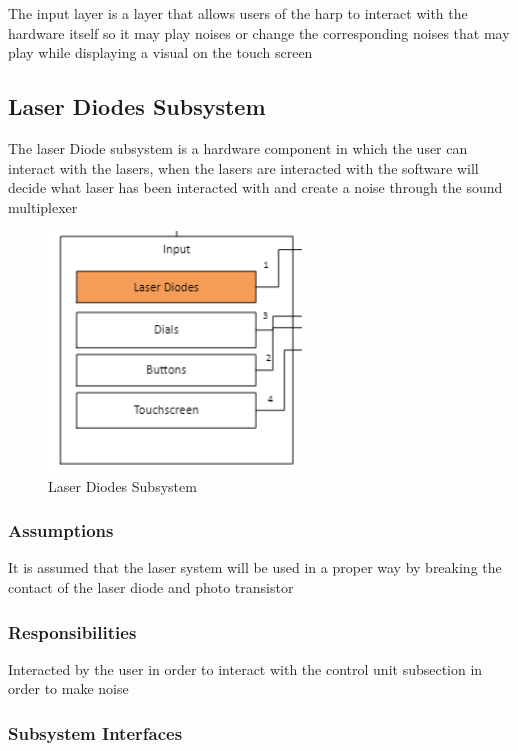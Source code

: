 The input layer is a layer that allows users of the harp to interact with the hardware itself so it may play noises or change the corresponding noises that may play while displaying a visual on the touch screen

\subsection{Laser Diodes Subsystem}
The laser Diode subsystem is a hardware component in which the user can interact with the lasers, when the lasers are interacted with the software will decide what laser has been interacted with and create a noise through the sound multiplexer


\begin{figure}[h!]
	\centering
 	\includegraphics[width=0.60\textwidth]{images/Laserdiodes}
 \caption{Laser Diodes Subsystem}
\end{figure}

\subsubsection{Assumptions}
It is assumed that the laser system will be used in a proper way by breaking the contact of the laser diode and photo transistor

\subsubsection{Responsibilities}
Interacted by the user in order to interact with the control unit subsection in order to make noise


\subsubsection{Subsystem Interfaces}

